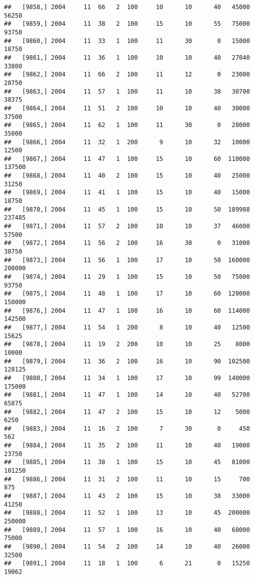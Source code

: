 \documentclass{article}\usepackage[]{graphicx}\usepackage[]{color}
\makeatletter
\newenvironment{kframe}{%
 \def\at@end@of@kframe{}%
 \ifinner\ifhmode%
  \def\at@end@of@kframe{\end{minipage}}%
  \begin{minipage}{\columnwidth}%
 \fi\fi%
 \def\FrameCommand##1{\hskip\@totalleftmargin \hskip-\fboxsep
 \colorbox{shadecolor}{##1}\hskip-\fboxsep
     \hskip-\linewidth \hskip-\@totalleftmargin \hskip\columnwidth}%
 \MakeFramed {\advance\hsize-\width
   \@totalleftmargin\z@ \linewidth\hsize
   \@setminipage}}%
 {\par\unskip\endMakeFramed%
 \at@end@of@kframe}
\newenvironment{knitrout}{}{} %
\makeatother
\begin{document}
\begin{knitrout}
\begin{kframe}
\begin{verbatim}
##   [9858,] 2004     11  66   2  100     10      10      40   45000   56250
##   [9859,] 2004     11  38   2  100     15      10      55   75000   93750
##   [9860,] 2004     11  33   1  100     11      30       0   15000   18750
##   [9861,] 2004     11  36   1  100     10      10      40   27040   33800
##   [9862,] 2004     11  66   2  100     11      12       0   23000   28750
##   [9863,] 2004     11  57   1  100     11      10      38   30700   38375
##   [9864,] 2004     11  51   2  100     10      10      40   30000   37500
##   [9865,] 2004     11  62   1  100     11      30       0   28000   35000
##   [9866,] 2004     11  32   1  200      9      10      32   10000   12500
##   [9867,] 2004     11  47   1  100     15      10      60  110000  137500
##   [9868,] 2004     11  40   2  100     15      10      40   25000   31250
##   [9869,] 2004     11  41   1  100     15      10      40   15000   18750
##   [9870,] 2004     11  45   1  100     15      10      50  189988  237485
##   [9871,] 2004     11  57   2  100     10      10      37   46000   57500
##   [9872,] 2004     11  56   2  100     16      30       0   31000   38750
##   [9873,] 2004     11  56   1  100     17      10      50  160000  200000
##   [9874,] 2004     11  29   1  100     15      10      50   75000   93750
##   [9875,] 2004     11  48   1  100     17      10      60  120000  150000
##   [9876,] 2004     11  47   1  100     16      10      60  114000  142500
##   [9877,] 2004     11  54   1  200      8      10      40   12500   15625
##   [9878,] 2004     11  19   2  200     10      10      25    8000   10000
##   [9879,] 2004     11  36   2  100     16      10      90  102500  128125
##   [9880,] 2004     11  34   1  100     17      10      99  140000  175000
##   [9881,] 2004     11  47   1  100     14      10      40   52700   65875
##   [9882,] 2004     11  47   2  100     15      10      12    5000    6250
##   [9883,] 2004     11  16   2  100      7      30       0     450     562
##   [9884,] 2004     11  35   2  100     11      10      40   19000   23750
##   [9885,] 2004     11  38   1  100     15      10      45   81000  101250
##   [9886,] 2004     11  31   2  100     11      10      15     700     875
##   [9887,] 2004     11  43   2  100     15      10      38   33000   41250
##   [9888,] 2004     11  52   1  100     13      10      45  200000  250000
##   [9889,] 2004     11  57   1  100     16      10      40   60000   75000
##   [9890,] 2004     11  54   2  100     14      10      40   26000   32500
##   [9891,] 2004     11  18   1  100      6      21       0   15250   19062

\end{verbatim}
\end{kframe}
\end{knitrout}
\end{document}
